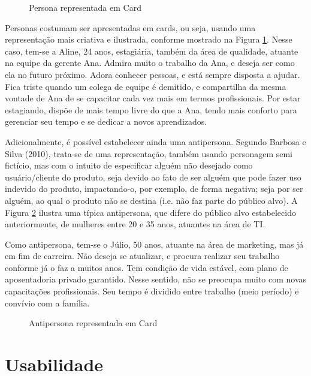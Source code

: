 \begin{figure}[h!]
	\centering
	\caption{Persona representada em Card}
	\label{fig01}
\end{figure}

Personas costumam ser apresentadas em cards, ou seja, usando uma representação mais criativa e ilustrada, conforme mostrado na 
Figura \ref{fig01}. Nesse caso, tem-se a Aline, 24 anos, estagiária, também da área de qualidade, atuante na equipe da gerente Ana. Admira 
muito o trabalho da Ana, e deseja ser como ela no futuro próximo. Adora conhecer pessoas, e está sempre disposta a ajudar. Fica 
triste quando um colega de equipe é demitido, e compartilha da mesma vontade de Ana de se capacitar cada vez mais em termos profissionais. 
Por estar estagiando, dispõe de mais tempo livre do que a Ana, tendo mais conforto para gerenciar seu tempo e se dedicar a novos aprendizados.

Adicionalmente, é possível estabelecer ainda uma antipersona. Segundo Barbosa e Silva (2010), trata-se de uma representação, também usando 
personagem semi fictício, mas com o intuito de especificar alguém não desejado como usuário/cliente do produto, seja devido ao fato de ser 
alguém que pode fazer uso indevido do produto, impactando-o, por exemplo, de forma negativa; seja por ser alguém, ao qual o produto não se 
destina (i.e. não faz parte do público alvo). A Figura \ref{fig02} ilustra uma típica antipersona, que difere do público alvo estabelecido anteriormente, 
de mulheres entre 20 e 35 anos, atuantes na área de TI.

Como antipersona, tem-se o Júlio, 50 anos, atuante na área de marketing, mas já em fim de carreira. Não deseja se atualizar, e procura realizar 
seu trabalho conforme já o faz a muitos anos. Tem condição de vida estável, com plano de aposentadoria privado garantido. Nesse sentido, não se 
preocupa muito com novas capacitações profissionais. Seu tempo é dividido entre trabalho (meio período) e convívio com a família.

\begin{figure}[h!]
	\centering
	\caption{Antipersona representada em Card}
	\label{fig02}
\end{figure}

\section{Usabilidade}
\label{sec:Usabilidade}

